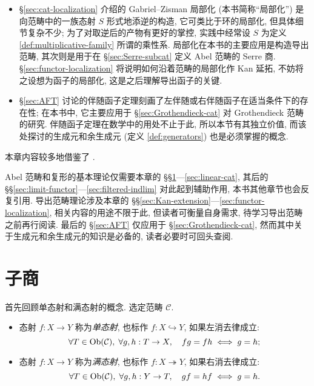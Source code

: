 \begin{itemize}
	\item \S\ref{sec:cat-localization} 介绍的 Gabriel--Zisman 局部化 (本书简称``局部化'') 是向范畴中的一族态射 $S$ 形式地添逆的构造, 它可类比于环的局部化, 但具体细节复杂不少; 为了对取逆后的产物有更好的掌控, 实践中经常设 $S$ 为定义 \ref{def:multiplicative-family} 所谓的乘性系. 局部化在本书的主要应用是构造导出范畴, 其次则是用于在 \S\ref{sec:Serre-subcat} 定义 Abel 范畴的 Serre 商. \S\ref{sec:functor-localization} 将说明如何沿着范畴的局部化作 Kan 延拓, 不妨将之设想为函子的局部化, 这是之后理解导出函子的关键.
	
	\item \S\ref{sec:AFT} 讨论的伴随函子定理刻画了左伴随或右伴随函子在适当条件下的存在性; 在本书中, 它主要应用于 \S\ref{sec:Grothendieck-cat} 对 Grothendieck 范畴的研究. 伴随函子定理在数学中的用处不止于此, 所以本节有其独立价值, 而该处探讨的生成元和余生成元 (定义 \ref{def:generators}) 也是必须掌握的概念.
\end{itemize}

本章内容较多地借鉴了 \cite{KS06, Rie16}.

\begin{wenxintishi}
	Abel 范畴和复形的基本理论仅需要本章的 \S\S\ref{sec:subquot}---\ref{sec:linear-cat}, 其后的 \S\S\ref{sec:limit-functor}---\ref{sec:filtered-indlim} 对此起到辅助作用, 本书其他章节也会反复引用. 导出范畴理论涉及本章的 \S\S\ref{sec:Kan-extension}---\ref{sec:functor-localization}, 相关内容的用途不限于此, 但读者可衡量自身需求, 待学习导出范畴之前再行阅读. 最后的 \S\ref{sec:AFT} 仅应用于 \S\ref{sec:Grothendieck-cat}, 然而其中关于生成元和余生成元的知识是必备的, 读者必要时可回头查阅.
\end{wenxintishi}

\section{子商}\label{sec:subquot}
首先回顾单态射和满态射的概念. 选定范畴 $\mathcal{C}$.

\begin{itemize}
	\item 态射 $f: X \to Y$ 称为\emph{单态射}, 也标作 $f: X \hookrightarrow Y$, 如果左消去律成立:
	\[ \forall T \in \operatorname{Ob}(\mathcal{C}), \; \forall g,h: T \to X , \quad fg=fh \iff g=h; \]
	\item 态射 $f: X \to Y$ 称为\emph{满态射}, 也标作 $f: X \twoheadrightarrow Y$, 如果右消去律成立:
	\[ \forall T \in \operatorname{Ob}(\mathcal{C}), \; \forall g,h: Y \to T, \quad gf=hf \iff g=h. \]
\end{itemize}

